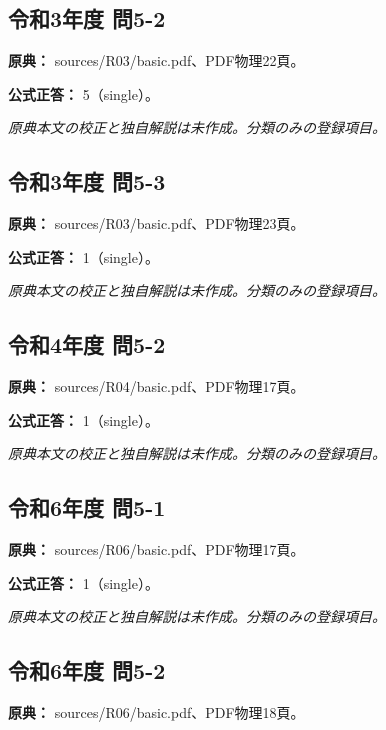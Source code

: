 \subsection{令和3年度 問5-2}
\label{q:r03-reg-basic-5-2}

\noindent\textbf{原典：} sources/R03/basic.pdf、PDF物理22頁。

\textbf{公式正答：} 5（single）。

\par\textit{原典本文の校正と独自解説は未作成。分類のみの登録項目。}

\subsection{令和3年度 問5-3}
\label{q:r03-reg-basic-5-3}

\noindent\textbf{原典：} sources/R03/basic.pdf、PDF物理23頁。

\textbf{公式正答：} 1（single）。

\par\textit{原典本文の校正と独自解説は未作成。分類のみの登録項目。}

\subsection{令和4年度 問5-2}
\label{q:r04-reg-basic-5-2}

\noindent\textbf{原典：} sources/R04/basic.pdf、PDF物理17頁。

\textbf{公式正答：} 1（single）。

\par\textit{原典本文の校正と独自解説は未作成。分類のみの登録項目。}

\subsection{令和6年度 問5-1}
\label{q:r06-reg-basic-5-1}

\noindent\textbf{原典：} sources/R06/basic.pdf、PDF物理17頁。

\textbf{公式正答：} 1（single）。

\par\textit{原典本文の校正と独自解説は未作成。分類のみの登録項目。}

\subsection{令和6年度 問5-2}
\label{q:r06-reg-basic-5-2}

\noindent\textbf{原典：} sources/R06/basic.pdf、PDF物理18頁。

